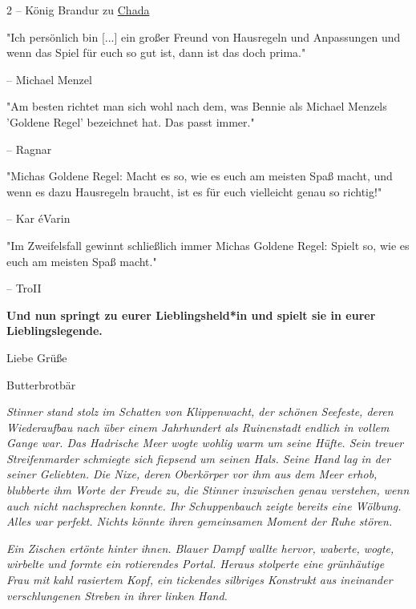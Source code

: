 \documentclass[10pt, a4paper, oneside]{book}
\newcommand{\fan}[1]{\textit{#1}}
\begin{document}
\begin{multicols*}{2}
– König Brandur zu \hyperref[Bogenschützin]{Chada}
\supercite{LdK:Der_König_von_Andor}

\bigskip

"Ich persönlich bin [...] ein großer Freund von Hausregeln und Anpassungen und wenn das Spiel für euch so gut ist, dann ist das doch prima." 

– Michael Menzel
\supercite{32174}

\bigskip

"Am besten richtet man sich wohl nach dem, was Bennie als Michael Menzels
'Goldene Regel' bezeichnet hat. Das passt immer." 

– Ragnar
\supercite{47207}

\bigskip

"Michas Goldene Regel: Macht es so, wie es euch am meisten Spaß macht, und wenn es dazu Hausregeln braucht, ist es für euch vielleicht genau so richtig!" 

– Kar éVarin
\supercite{97401}

\bigskip

"Im Zweifelsfall gewinnt schließlich immer Michas Goldene Regel: Spielt so, wie es euch am meisten Spaß macht." 

– TroII
\supercite{118167}

\bigskip

\textbf{Und nun springt zu eurer Lieblingsheld*in und spielt sie in eurer Lieblingslegende.}\bigskip

Liebe Grüße

Butterbrotbär

\vspace*{\fill}
\columnbreak




\textit{\fan{Stinner stand stolz im Schatten von Klippenwacht, der schönen Seefeste, deren Wiederaufbau nach über einem Jahrhundert als Ruinenstadt endlich in vollem Gange war. Das Hadrische Meer wogte wohlig warm um seine Hüfte. Sein treuer Streifenmarder schmiegte sich fiepsend um seinen Hals. Seine Hand lag in der seiner Geliebten. Die Nixe, deren Oberkörper vor ihm aus dem Meer erhob, blubberte ihm Worte der Freude zu, die Stinner inzwischen genau verstehen, wenn auch nicht nachsprechen konnte. Ihr Schuppenbauch zeigte bereits eine Wölbung. Alles war perfekt. Nichts könnte ihren gemeinsamen Moment der Ruhe stören.}}

\textit{\fan{Ein Zischen ertönte hinter ihnen. Blauer Dampf wallte hervor, waberte, wogte, wirbelte und formte ein rotierendes Portal. Heraus stolperte eine grünhäutige Frau mit kahl rasiertem Kopf, ein tickendes silbriges Konstrukt aus ineinander verschlungenen Streben in ihrer linken Hand.}}


\end{multicols*}
\end{document}
